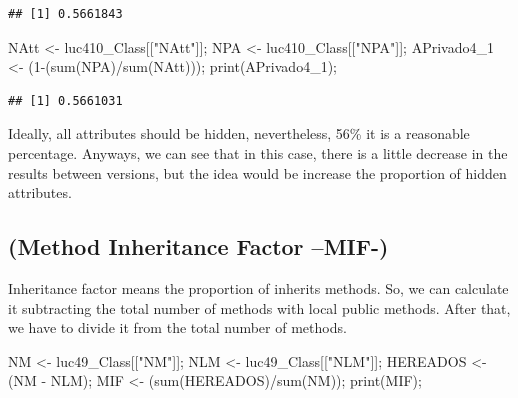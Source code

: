 \documentclass[
]{article}
\newenvironment{Shaded}{\begin{snugshade}}{\end{snugshade}}
\newcommand{\DecValTok}[1]{\textcolor[rgb]{0.00,0.00,0.81}{#1}}
\newcommand{\FunctionTok}[1]{\textcolor[rgb]{0.00,0.00,0.00}{#1}}
\newcommand{\NormalTok}[1]{#1}
\newcommand{\OtherTok}[1]{\textcolor[rgb]{0.56,0.35,0.01}{#1}}
\newcommand{\SpecialCharTok}[1]{\textcolor[rgb]{0.00,0.00,0.00}{#1}}
\newcommand{\StringTok}[1]{\textcolor[rgb]{0.31,0.60,0.02}{#1}}
\begin{document}
\begin{verbatim}
## [1] 0.5661843
\end{verbatim}

\begin{Shaded}
\begin{Highlighting}[]
\NormalTok{NAtt }\OtherTok{\textless{}{-}}\NormalTok{ luc410\_Class[[}\StringTok{"NAtt"}\NormalTok{]];}
\NormalTok{NPA }\OtherTok{\textless{}{-}}\NormalTok{ luc410\_Class[[}\StringTok{"NPA"}\NormalTok{]];}
\NormalTok{APrivado4\_1 }\OtherTok{\textless{}{-}}\NormalTok{ (}\DecValTok{1}\SpecialCharTok{{-}}\NormalTok{(}\FunctionTok{sum}\NormalTok{(NPA)}\SpecialCharTok{/}\FunctionTok{sum}\NormalTok{(NAtt)));}
\FunctionTok{print}\NormalTok{(APrivado4\_1);}
\end{Highlighting}
\end{Shaded}

\begin{verbatim}
## [1] 0.5661031
\end{verbatim}

Ideally, all attributes should be hidden, nevertheless, 56\% it is a
reasonable percentage. Anyways, we can see that in this case, there is a
little decrease in the results between versions, but the idea would be
increase the proportion of hidden attributes.

\hypertarget{method-inheritance-factor-mif-}{%
\subsection{(Method Inheritance Factor
--MIF-)}\label{method-inheritance-factor-mif-}}

Inheritance factor means the proportion of inherits methods. So, we can
calculate it subtracting the total number of methods with local public
methods. After that, we have to divide it from the total number of
methods.

\begin{Shaded}
\begin{Highlighting}[]
\NormalTok{NM }\OtherTok{\textless{}{-}}\NormalTok{ luc49\_Class[[}\StringTok{"NM"}\NormalTok{]];}
\NormalTok{NLM }\OtherTok{\textless{}{-}}\NormalTok{ luc49\_Class[[}\StringTok{"NLM"}\NormalTok{]];}
\NormalTok{HEREADOS }\OtherTok{\textless{}{-}}\NormalTok{ (NM }\SpecialCharTok{{-}}\NormalTok{ NLM);}
\NormalTok{MIF }\OtherTok{\textless{}{-}}\NormalTok{ (}\FunctionTok{sum}\NormalTok{(HEREADOS)}\SpecialCharTok{/}\FunctionTok{sum}\NormalTok{(NM));}
\FunctionTok{print}\NormalTok{(MIF);}
\end{Highlighting}
\end{Shaded}
\end{document}
